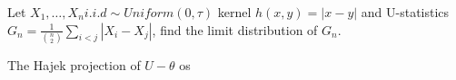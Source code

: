 


\begin{problem}
    Let $X_1,\ldots,X_n i.i.d \sim Uniform(0,\tau)$ kernel $h(x,y)=|x-y|$ and U-statistics $G_n=\frac{1}{{n\choose 2}}\sum_{i<j}|X_i-X_j|$, find the limit distribution of $G_n$.
\end{problem}

\begin{solution}
    The Hajek projection of $U-\theta$ os 
\end{solution}